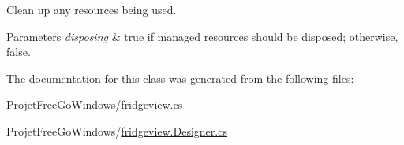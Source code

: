 Clean up any resources being used. 


\begin{DoxyParams}{Parameters}
{\em disposing} & true if managed resources should be disposed; otherwise, false.\\
\hline
\end{DoxyParams}


The documentation for this class was generated from the following files\+:\begin{DoxyCompactItemize}
\item 
Projet\+Free\+Go\+Windows/\hyperlink{fridgeview_8cs}{fridgeview.\+cs}\item 
Projet\+Free\+Go\+Windows/\hyperlink{fridgeview_8_designer_8cs}{fridgeview.\+Designer.\+cs}\end{DoxyCompactItemize}
